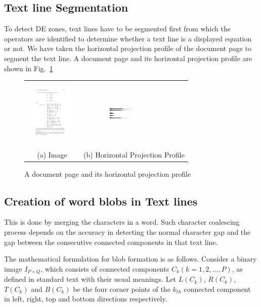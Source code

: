 \documentclass[oneside,a4paper,12pt]{book}
\begin{document}
\subsection{Text line Segmentation}
 To detect DE zones, text lines have to be segmented first from which the operators are identified to 
 determine whether a text line is a displayed equation or not. We have taken the horizontal projection
 profile of the document page to segment the text line. A document page and its horizontal projection 
 profile are shown in Fig.~\ref{hproj}
 \begin{figure}[h]\center\footnotesize

\begin{tabular}{|c|c|}\hline
 \includegraphics[width=1.0in, height=1.3in]{org.png} &
 \includegraphics[width=1.0in, height=1.3in]{hProj.png} \\ 
 (a) Image &(b) Horizontal Projection Profile
 \\\hline
 \end{tabular}
 \caption{A document page and its horizontal projection profile}
 \label{hproj}
\end{figure}
 
 \subsection{Creation of word blobs in Text lines}
 This is done by merging the characters in a word. Such character coalescing process depends on the accuracy in detecting the normal
character gap and the gap between the consecutive connected components in that text line.

The mathematical formulation for  blob formation is as follows.
Consider a binary image $I_{P \times Q}$, which consists of connected
components $C_k (k=1,2,\ldots ,P)$, as defined in standard text \cite{gonzalez92}
with their usual meanings.
Let $L(C_k)$, $R(C_k)$, $T(C_k)$ and $B(C_k)$
be the four corner  points of the $k_{th}$ connected component in  left, right, top and bottom
directions respectively.
\end{document}
